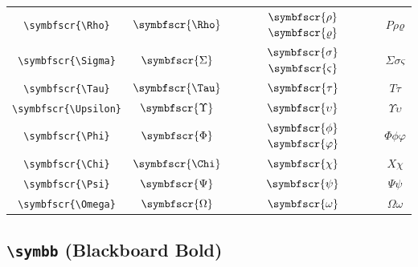 \documentclass[12pt,a4paper]{article}
\begin{document}
\begin{longtable}{|c|c|c|c|}
\verb|\symbfscr{\Rho}| & $\symbfscr{\Rho}$ & $\symbfscr{\rho}$ $\symbfscr{\varrho}$ & $ Ρ 𝜌 𝜚 $ \\
\verb|\symbfscr{\Sigma}| & $\symbfscr{\Sigma}$ & $\symbfscr{\sigma}$ $\symbfscr{\varsigma}$ & $ Σ 𝜎 𝜍 $ \\
\verb|\symbfscr{\Tau}| & $\symbfscr{\Tau}$ & $\symbfscr{\tau}$ & $ Τ 𝜏 $ \\
\verb|\symbfscr{\Upsilon}| & $\symbfscr{\Upsilon}$ & $\symbfscr{\upsilon}$ & $ Υ 𝜐 $ \\
\verb|\symbfscr{\Phi}| & $\symbfscr{\Phi}$ & $\symbfscr{\phi}$ $\symbfscr{\varphi}$ & $ Φ 𝜙 𝜑 $ \\
\verb|\symbfscr{\Chi}| & $\symbfscr{\Chi}$ & $\symbfscr{\chi}$ & $ Χ 𝜒 $ \\
\verb|\symbfscr{\Psi}| & $\symbfscr{\Psi}$ & $\symbfscr{\psi}$ & $ Ψ 𝜓 $ \\
\verb|\symbfscr{\Omega}| & $\symbfscr{\Omega}$ & $\symbfscr{\omega}$ & $ Ω 𝜔 $ \\
\hline
\end{longtable}

\newpage

\subsection*{\texttt{\textbackslash{}symbb} (Blackboard Bold)}
\end{document}
